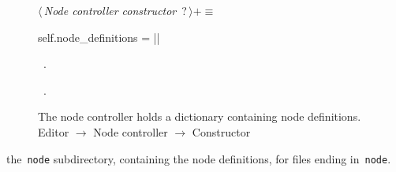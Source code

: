 \documentclass[%
    a4paper,    %
    justified,  %
    nobib,      %
    openany     %
]{tufte-book}
\begin{document}
\begin{figure}
\begin{flushleft} \small
\begin{minipage}{\linewidth}\label{scrap122}\raggedright\small
{} $\langle\,${\itshape Node controller constructor}\nobreak\ {\footnotesize {?}}$\,\rangle+\equiv$
\vspace{-1ex}
\begin{pythoncode}
    self.node_definitions = {}
|\NWsep|
\end{pythoncode}
\vspace{1.5ex}
\footnotesize
\begin{list}{}{\setlength{\itemsep}{-\parsep}\setlength{\itemindent}{-\leftmargin}}
\item \NWtxtMacroDefBy\ .
\item \NWtxtMacroRefIn\ .

\item{}
\end{list}
\end{minipage}\vspace{4ex}
\end{flushleft}
\caption{The node controller holds a dictionary containing node definitions.
  \newline{}\newline{}Editor $\rightarrow$ Node controller $\rightarrow$
  Constructor}
\label{editor:lst:node-controller:constructor:node-definitions}
\end{figure}

 the~\verb=node= subdirectory, containing
the node definitions, for files ending in~\verb=node=.
\end{document}
